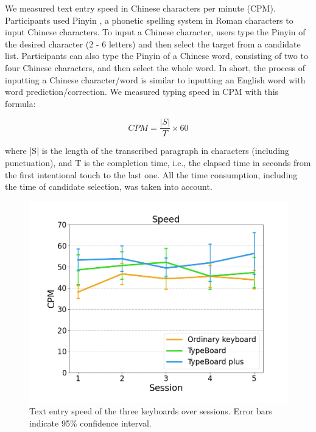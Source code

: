 We measured text entry speed in Chinese characters per minute (CPM). Participants used Pinyin \cite{Website-Pinyin}, a phonetic spelling system in Roman characters to input Chinese characters. To input a Chinese character, users type the Pinyin of the desired character (2 - 6 letters) and then select the target from a candidate list. Participants can also type the Pinyin of a Chinese word, consisting of two to four Chinese characters, and then select the whole word. In short, the process of inputting a Chinese character/word is similar to inputting an English word with word prediction/correction. We measured typing speed in CPM with this formula:

\begin{equation}
	CPM = \frac{|S|}{T} \times 60
\end{equation}

where |S| is the length of the transcribed paragraph in characters (including punctuation), and T is the completion time, i.e., the elapsed time in seconds from the first intentional touch to the last one. All the time consumption, including the time of candidate selection, was taken into account.


\begin{figure}[!tbh]
	\includegraphics[width=0.6\linewidth]{figures/speed.png}
	\centering
	\caption{Text entry speed of the three keyboards over sessions. Error bars indicate 95\% confidence interval.}
	\label{fig:speed}
\end{figure}

